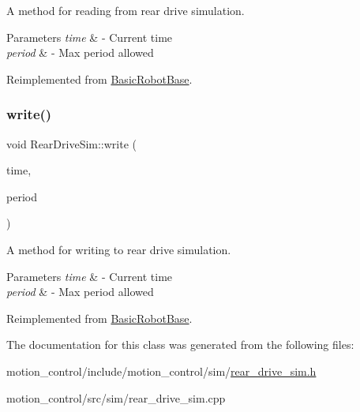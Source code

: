 A method for reading from rear drive simulation. 


\begin{DoxyParams}{Parameters}
{\em time} & -\/ Current time \\
\hline
{\em period} & -\/ Max period allowed \\
\hline
\end{DoxyParams}


Reimplemented from \hyperlink{classBasicRobotBase_a64bb2c7bed72e98fb62a37d6beb4fe5a}{Basic\+Robot\+Base}.

\mbox{\label{classRearDriveSim_a814f528a26c9dcf0b0d3490883abb2d2}} 
\subsubsection{\texorpdfstring{write()}{write()}}
{\footnotesize\ttfamily void Rear\+Drive\+Sim\+::write (\begin{DoxyParamCaption}\item[{const ros\+::\+Time \&}]{time,  }\item[{const ros\+::\+Duration \&}]{period }\end{DoxyParamCaption})\hspace{0.3cm}{\ttfamily [virtual]}}



A method for writing to rear drive simulation. 


\begin{DoxyParams}{Parameters}
{\em time} & -\/ Current time \\
\hline
{\em period} & -\/ Max period allowed \\
\hline
\end{DoxyParams}


Reimplemented from \hyperlink{classBasicRobotBase_afbc6ef4347fc05e053391692a9e1bc24}{Basic\+Robot\+Base}.



The documentation for this class was generated from the following files\+:\begin{DoxyCompactItemize}
\item 
motion\+\_\+control/include/motion\+\_\+control/sim/\hyperlink{rear__drive__sim_8h}{rear\+\_\+drive\+\_\+sim.\+h}\item 
motion\+\_\+control/src/sim/rear\+\_\+drive\+\_\+sim.\+cpp\end{DoxyCompactItemize}
